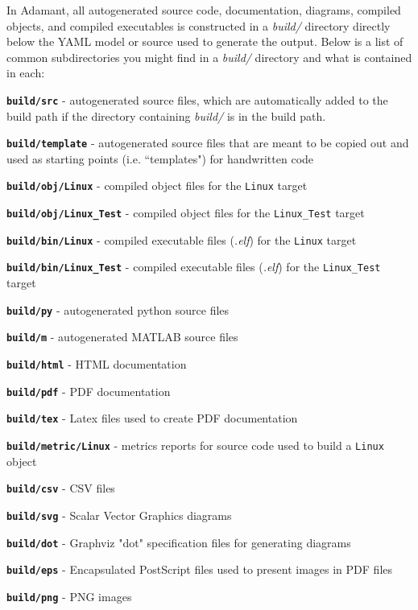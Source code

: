 In Adamant, all autogenerated source code, documentation, diagrams, compiled objects, and compiled executables is constructed in a \textit{build/} directory directly below the YAML model or source used to generate the output. Below is a list of common subdirectories you might find in a \textit{build/} directory and what is contained in each:

\vspace{5mm} %
\begin{spaceditemize}
  \item \textbf{\texttt{build/src}} - autogenerated source files, which are automatically added to the build path if the directory containing \textit{build/} is in the build path.
  \item \textbf{\texttt{build/template}} - autogenerated source files that are meant to be copied out and used as starting points (i.e. ``templates") for handwritten code
  \item \textbf{\texttt{build/obj/Linux}} - compiled object files for the \texttt{Linux} target
  \item \textbf{\texttt{build/obj/Linux\_Test}} - compiled object files for the \texttt{Linux\_Test} target
  \item \textbf{\texttt{build/bin/Linux}} - compiled executable files (\textit{.elf}) for the \texttt{Linux} target
  \item \textbf{\texttt{build/bin/Linux\_Test}} - compiled executable files (\textit{.elf}) for the \texttt{Linux\_Test} target
  \item \textbf{\texttt{build/py}} - autogenerated python source files
  \item \textbf{\texttt{build/m}} - autogenerated MATLAB source files
  \item \textbf{\texttt{build/html}} - HTML documentation
  \item \textbf{\texttt{build/pdf}} - PDF documentation
  \item \textbf{\texttt{build/tex}} - Latex files used to create PDF documentation
  \item \textbf{\texttt{build/metric/Linux}} - metrics reports for source code used to build a \texttt{Linux} object
  \item \textbf{\texttt{build/csv}} - CSV files
  \item \textbf{\texttt{build/svg}} - Scalar Vector Graphics diagrams
  \item \textbf{\texttt{build/dot}} - Graphviz "dot" specification files for generating diagrams
  \item \textbf{\texttt{build/eps}} - Encapsulated PostScript files used to present images in PDF files
  \item \textbf{\texttt{build/png}} - PNG images
\end{spaceditemize}
\vspace{5mm} %

